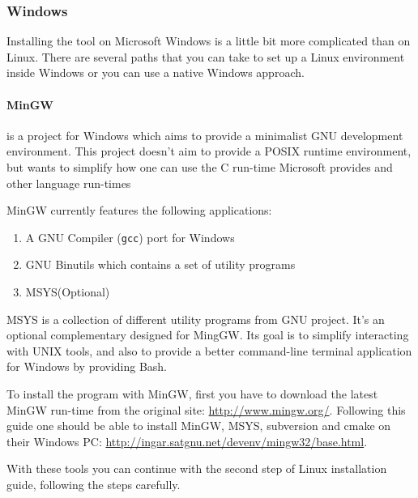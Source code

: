 \subsubsection{Windows}
\par Installing the tool on Microsoft Windows is a little bit more complicated than on Linux. There are several paths that you can take to set up a Linux environment inside Windows or you can use a native Windows approach.
\paragraph{MinGW} is a project for Windows which aims to provide a minimalist GNU development environment\cite{mingw_homepage}. This project doesn't aim to provide a POSIX runtime environment\cite{mingw_homepage}, but wants to simplify how one can use the C run-time Microsoft provides and other language run-times \medskip
\par MinGW currently features the following applications:
\begin{enumerate}
    \item A GNU Compiler (\verb|gcc|) port for Windows
    \item GNU Binutils which contains a set of utility programs
    \item MSYS(Optional)
\end{enumerate}
\par MSYS is a collection of different utility programs from GNU project. It's an optional complementary designed for MingGW\cite{mysis_page}. Its goal is to simplify interacting with UNIX tools, and also to provide a better command-line terminal application for Windows by providing Bash. \medskip
\par To install the program with MinGW, first you have to download the latest MinGW run-time from the original site: \url{http://www.mingw.org/}. Following this guide one should be able to install MinGW, MSYS, subversion and cmake on their Windows PC: \url{http://ingar.satgnu.net/devenv/mingw32/base.html}. \medskip
\par With these tools you can continue with the second step of Linux installation guide, following the steps carefully. \medskip
